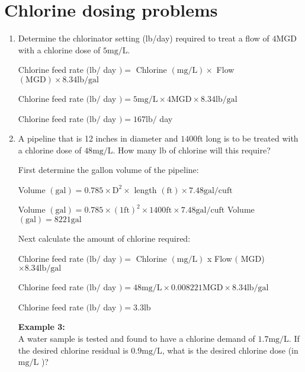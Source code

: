 \documentclass{article}
\begin{document}
\section{Chlorine dosing problems}
\begin{enumerate}
\item Determine the chlorinator setting (lb/day) required to treat a flow of $4 \mathrm{MGD}$ with a chlorine dose of $5 \mathrm{mg} / \mathrm{L}$.

Chlorine feed rate $(\mathrm{lb} /$ day $)=$ Chlorine $(\mathrm{mg} / \mathrm{L}) \times$ Flow $(\mathrm{MGD}) \times 8.34 \mathrm{lb} / \mathrm{gal}$

Chlorine feed rate $(\mathrm{lb} /$ day $)=5 \mathrm{mg} / \mathrm{L} \times 4 \mathrm{MGD} \times 8.34 \mathrm{lb} / \mathrm{gal}$

Chlorine feed rate $(\mathrm{lb} /$ day $)=167 \mathrm{lb} /$ day

\item A pipeline that is 12 inches in diameter and $1400 \mathrm{ft}$ long is to be treated with a chlorine dose of $48 \mathrm{mg} / \mathrm{L}$. How many lb of chlorine will this require?

First determine the gallon volume of the pipeline:

Volume $(\mathrm{gal})=0.785 \times \mathrm{D}^{2} \times$ length $(\mathrm{ft}) \times 7.48 \mathrm{gal} / \mathrm{cu} \mathrm{ft}$

Volume $(\mathrm{gal})=0.785 \times(1 \mathrm{ft})^{2} \times 1400 \mathrm{ft} \times 7.48 \mathrm{gal} / \mathrm{cu} \mathrm{ft}$ Volume $(\mathrm{gal})=8221 \mathrm{gal}$

Next calculate the amount of chlorine required:

Chlorine feed rate $(\mathrm{lb} /$ day $)=$ Chlorine $(\mathrm{mg} / \mathrm{L})$ x Flow $($ MGD) $\times 8.34 \mathrm{lb} / \mathrm{gal}$

Chlorine feed rate $(\mathrm{lb} /$ day $)=48 \mathrm{mg} / \mathrm{L} \times 0.008221 \mathrm{MGD} \times 8.34 \mathrm{lb} / \mathrm{gal}$

Chlorine feed rate $(\mathrm{lb} /$ day $)=3.3 \mathrm{lb}$

\textbf{Example 3:}\\
A water sample is tested and found to have a chlorine demand of $1.7 \mathrm{mg} / \mathrm{L}$. If the desired chlorine residual is $0.9 \mathrm{mg} / \mathrm{L}$, what is the desired chlorine dose (in $\mathrm{mg} / \mathrm{L}$ )?


\end{enumerate}
\end{document}

